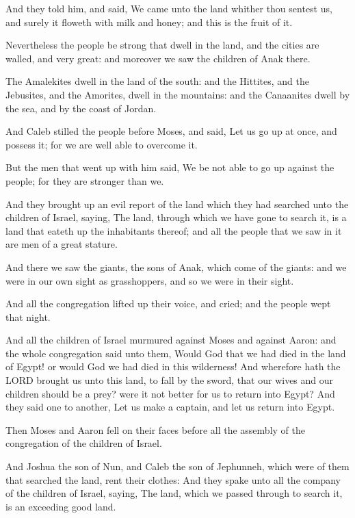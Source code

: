 \Verse And they told him, and said, We came unto the land whither thou
sentest us, and surely it floweth with milk and honey; and this is the
fruit of it.

\Verse Nevertheless the people be strong that dwell in the land, and
the cities are walled, and very great: and moreover we saw the
children of Anak there.

\Verse The Amalekites dwell in the land of the south: and the Hittites,
and the Jebusites, and the Amorites, dwell in the mountains: and the
Canaanites dwell by the sea, and by the coast of Jordan.

\Verse And Caleb stilled the people before Moses, and said, Let us go
up at once, and possess it; for we are well able to overcome it.

\Verse But the men that went up with him said, We be not able to go up
against the people; for they are stronger than we.

\Verse And they brought up an evil report of the land which they had
searched unto the children of Israel, saying, The land, through which
we have gone to search it, is a land that eateth up the inhabitants
thereof; and all the people that we saw in it are men of a great
stature.

\Verse And there we saw the giants, the sons of Anak, which come of the
giants: and we were in our own sight as grasshoppers, and so we were
in their sight.


\Chapter
\Verse And all the congregation lifted up their voice, and cried; and
the people wept that night.

\Verse And all the children of Israel murmured against Moses and against
Aaron: and the whole congregation said unto them, Would God that we
had died in the land of Egypt! or would God we had died in this
wilderness!  \Verse And wherefore hath the LORD brought us unto this
land, to fall by the sword, that our wives and our children should be
a prey? were it not better for us to return into Egypt?  \Verse And they
said one to another, Let us make a captain, and let us return into
Egypt.

\Verse Then Moses and Aaron fell on their faces before all the assembly
of the congregation of the children of Israel.

\Verse And Joshua the son of Nun, and Caleb the son of Jephunneh, which
were of them that searched the land, rent their clothes: \Verse And they
spake unto all the company of the children of Israel, saying, The
land, which we passed through to search it, is an exceeding good land.

